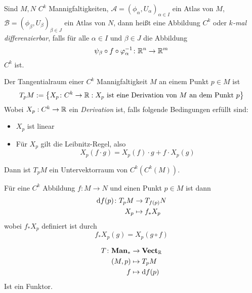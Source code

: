 \begin{definition}[Differenzierbarkeit]
    \label{anh.def: differenzierbarkeit}
    Sind $M, N$ $C^k$ Mannigfaltigkeiten, 
    $\mathcal{A} = (\phi_{\alpha}, U_{\alpha})_{\alpha \in I}$ ein Atlas von $M$, 
    $\mathcal{B} = (\phi_{\beta}, U_{\beta})_{\beta \in J}$ ein Atlas von $N$,
    dann heißt eine Abbildung $C^k$ oder \textit{$k$-mal differenzierbar}, falls für alle 
    $\alpha \in I$ und $\beta \in J$ die Abbildung
    \[ \psi_{\beta} \circ f \circ \varphi_{\alpha}^{-1} \colon { \mathbb R }^n \to { \mathbb R }^m \]
    $C^k$ ist.
\end{definition}

\begin{definition}[Tangentialraum]
    Der Tangentialraum einer $C^k$ Mannigfaltigkeit $M$ an einem Punkt $p \in M$ ist
    \[ T_pM := \left\{ X_p \colon C^{k} \to { \mathbb R } : X_p 
        \text{ ist eine Derivation von $M$ an dem Punkt $p$} \right\} \]
    Wobei $X_p: C^{k} \to { \mathbb R }$ ein \textit{Derivation} ist, falls folgende Bedingungen erfüllt
    sind:
    \begin{itemize}
        \item $X_p$ ist linear
        \item Für $X_p$ gilt die Leibnitz-Regel, also
            \[ X_p (f \cdot g) = X_p (f) \cdot g + f \cdot X_p (g) \]
    \end{itemize}
    Dann ist $T_pM$ ein Untervektorraum von $C^k(C^k(M))$.

    Für eine $C^k$ Abbildung $f \colon M \to N$  und einen Punkt $p \in M$ ist dann 
    \begin{align*}
        { \operatorname{d} } f (p) \colon T_pM & \to T_{f(p)}N \\
        X_p & \mapsto f_* X_p
    \end{align*}
    wobei $f_*X_p$ definiert ist durch
    \[ f_*X_p (g) = X_p (g \circ f) \]
\end{definition}

\begin{remark}
    \begin{align*}
        T \colon \mathbf{Man}_{*} & \to \mathbf{Vect}_{{ \mathbb R }} \\
        (M, p) & \mapsto T_pM \\
        f & \mapsto { \operatorname{d} } f (p)
    \end{align*}
    Ist ein Funktor.
\end{remark}

